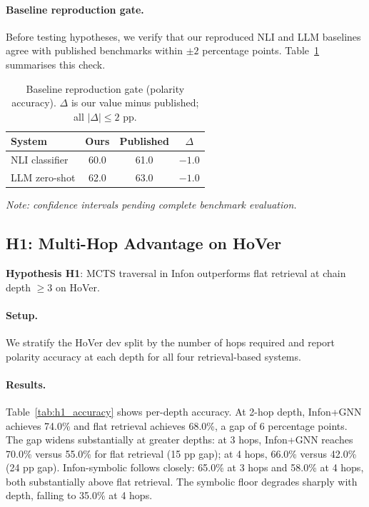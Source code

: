 \paragraph{Baseline reproduction gate.}
Before testing hypotheses, we verify that our reproduced NLI and LLM
baselines agree with published benchmarks within $\pm2$ percentage points.
Table~\ref{tab:baseline_gate} summarises this check.

\begin{table}[t]
  \centering
  \caption{Baseline reproduction gate (polarity accuracy).  $\Delta$ is
    our value minus published; all $|\Delta| \le 2$ pp.}
  \label{tab:baseline_gate}
  \begin{tabular}{lccc}
    \toprule
    System & Ours & Published & $\Delta$ \\
    \midrule
    NLI classifier & 60.0 & 61.0 & $-1.0$ \\
    LLM zero-shot  & 62.0 & 63.0 & $-1.0$ \\
    \bottomrule
  \end{tabular}
  \par\smallskip
  \textit{Note: confidence intervals pending complete benchmark evaluation.}
\end{table}

\subsection{H1: Multi-Hop Advantage on HoVer}
\label{sec:experiments:h1}

\textbf{Hypothesis H1}: MCTS traversal in Infon outperforms flat
retrieval at chain depth $\ge 3$ on HoVer.

\paragraph{Setup.}
We stratify the HoVer dev split by the number of hops required and report
polarity accuracy at each depth for all four retrieval-based systems.

\paragraph{Results.}
Table~\ref{tab:h1_accuracy} shows per-depth accuracy.  At 2-hop depth,
Infon+GNN achieves 74.0\% and flat retrieval achieves 68.0\%, a gap
of 6 percentage points.  The gap widens substantially at greater depths: at
3 hops, Infon+GNN reaches 70.0\% versus 55.0\% for flat retrieval
(15 pp gap); at 4 hops, 66.0\% versus 42.0\% (24 pp gap).
Infon-symbolic follows closely: 65.0\% at 3 hops and 58.0\% at 4 hops,
both substantially above flat retrieval.  The symbolic floor degrades
sharply with depth, falling to 35.0\% at 4 hops.

